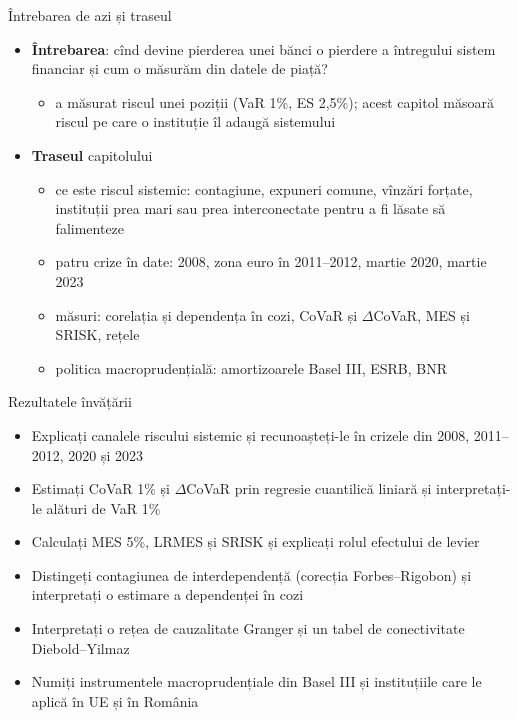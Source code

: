 \begin{frame}{Întrebarea de azi și traseul}
\itemsize{\small}
\begin{itemize}
    \item \textbf{Întrebarea}: cînd devine pierderea unei bănci o pierdere a întregului sistem financiar și cum o măsurăm din datele de piață?
    \begin{itemize}
        \item {} a măsurat riscul unei poziții (VaR 1\%, ES 2,5\%); acest capitol măsoară riscul pe care o instituție îl adaugă sistemului
    \end{itemize}
    \item \textbf{Traseul} capitolului
    \begin{itemize}
        \item ce este riscul sistemic: contagiune, expuneri comune, vînzări forțate, instituții prea mari sau prea interconectate pentru a fi lăsate să falimenteze
        \item patru crize în date: 2008, zona euro în 2011--2012, martie 2020, martie 2023
        \item măsuri: corelația și dependența în cozi, CoVaR și $\Delta$CoVaR, MES și SRISK, rețele
        \item politica macroprudențială: amortizoarele Basel III, ESRB, BNR
    \end{itemize}
\end{itemize}
\end{frame}

\begin{frame}{Rezultatele învățării}
\itemsize{\small}
\begin{itemize}
    \item Explicați canalele riscului sistemic și recunoașteți-le în crizele din 2008, 2011--2012, 2020 și 2023
    \item Estimați CoVaR 1\% și $\Delta$CoVaR prin regresie cuantilică liniară și interpretați-le alături de VaR 1\%
    \item Calculați MES 5\%, LRMES și SRISK și explicați rolul efectului de levier
    \item Distingeți contagiunea de interdependență (corecția Forbes--Rigobon) și interpretați o estimare a dependenței în cozi
    \item Interpretați o rețea de cauzalitate Granger și un tabel de conectivitate Diebold--Yilmaz
    \item Numiți instrumentele macroprudențiale din Basel III și instituțiile care le aplică în UE și în România
\end{itemize}
\end{frame}

